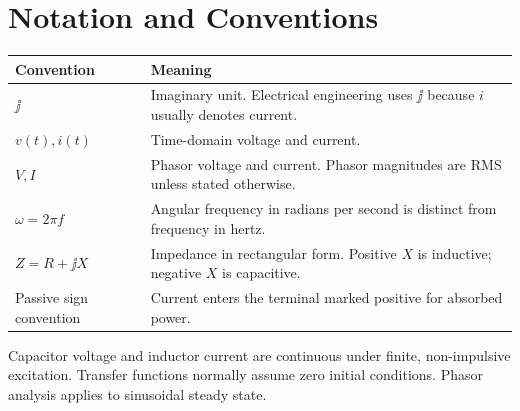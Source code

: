 \chapter*{Notation and Conventions}
\begin{tabularx}{\textwidth}{@{}L{0.28\textwidth}Y@{}}
\toprule
Convention & Meaning \\
\midrule
\(\jj\) & Imaginary unit. Electrical engineering uses \(\jj\) because \(i\) usually denotes current. \\
\(v(t), i(t)\) & Time-domain voltage and current. \\
\(V, I\) & Phasor voltage and current. Phasor magnitudes are RMS unless stated otherwise. \\
\(\omega=2\pi f\) & Angular frequency in radians per second is distinct from frequency in hertz. \\
\(Z=R+\jj X\) & Impedance in rectangular form. Positive \(X\) is inductive; negative \(X\) is capacitive. \\
Passive sign convention & Current enters the terminal marked positive for absorbed power. \\
\bottomrule
\end{tabularx}

Capacitor voltage and inductor current are continuous under finite,
non-impulsive excitation. Transfer functions normally assume zero initial
conditions. Phasor analysis applies to sinusoidal steady state.
